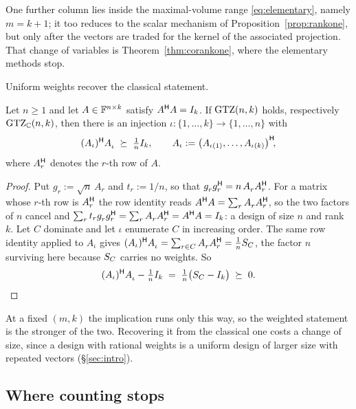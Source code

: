 One further column lies inside the maximal-volume range
\eqref{eq:elementary}, namely $m=k+1$; it too reduces to the scalar
mechanism of Proposition~\ref{prop:rankone}, but only after the vectors
are traded for the kernel of the associated projection.  That change of
variables is Theorem~\ref{thm:corankone}, where the elementary methods
stop.

Uniform weights recover the classical statement.

\begin{proposition}[Lean]\label{prop:classical}
Let $n\ge1$ and let $A\in\mathbb{F}^{n\times k}$ satisfy $A^{\mathsf{H}} A=I_k$.  If
$\mathrm{GTZ}(n,k)$ holds, respectively $\mathrm{GTZ}_{\mathbb{C}}(n,k)$, then there is an injection
$\iota:\{1,\dots,k\}\to\{1,\dots,n\}$ with
\[
  (A_\iota)\adj A_\iota^{\vphantom{\mathsf{H}}}\;\psd\;\tfrac1n I_k,
  \qquad A_\iota:=\bigl(A_{\iota(1)},\dots,A_{\iota(k)}\bigr)\adj\!,
\]
where $A_r^{\mathsf{H}}$ denotes the $r$-th row of $A$.
\end{proposition}

\begin{proof}
Put $g_r:=\sqrt n\,A_r$ and $t_r:=1/n$, so that
$g_r^{\vphantom{\mathsf{H}}}g_r\adj=n\,A_r^{\vphantom{\mathsf{H}}}A_r\adj$.
For a matrix whose $r$-th row is $A_r^{\mathsf{H}}$ the row identity reads
$A\adj A=\sum_r A_r^{\vphantom{\mathsf{H}}}A_r\adj$, so the two factors of
$n$ cancel and
$\sum_r t_r g_r^{\vphantom{\mathsf{H}}}g_r\adj=\sum_r A_r^{\vphantom{\mathsf{H}}}A_r\adj
=A\adj A=I_k$: a design of size $n$ and rank $k$.  Let $C$ dominate and
let $\iota$ enumerate $C$ in increasing order.  The same row identity
applied to $A_\iota$ gives
$(A_\iota)\adj A_\iota^{\vphantom{\mathsf{H}}}=\sum_{r\in C}A_r^{\vphantom{\mathsf{H}}}A_r\adj
=\frac1n\SC$, the factor $n$ surviving here because $S_{C}$ carries no
weights.  So
\[
  (A_\iota)\adj A_\iota^{\vphantom{\mathsf{H}}}-\tfrac1n I_k
  \;=\;\tfrac1n\bigl(\SC-I_k\bigr)\;\psd\;0 . \qedhere
\]
\end{proof}

At a fixed $(m,k)$ the implication runs only this way, so the weighted
statement is the stronger of the two.  Recovering it from the classical
one costs a change of size, since a design with rational weights is a
uniform design of larger size with repeated vectors (\S\ref{sec:intro}).

\subsection{Where counting stops}\label{sec:stops}


